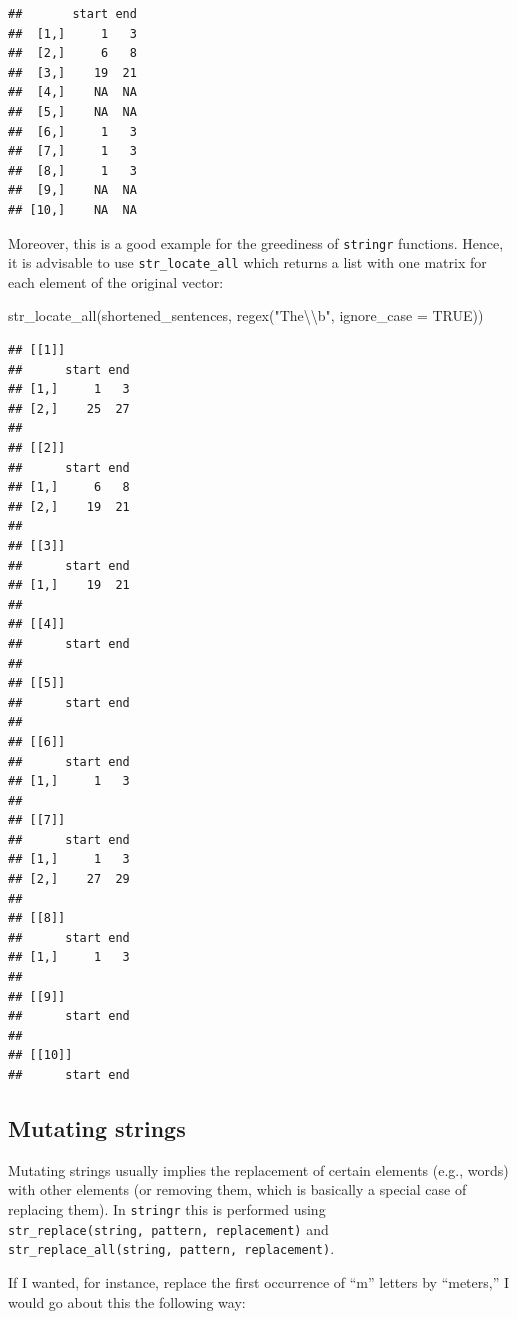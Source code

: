 \documentclass[
]{book}
\newenvironment{Shaded}{\begin{snugshade}}{\end{snugshade}}
\newcommand{\AttributeTok}[1]{\textcolor[rgb]{0.77,0.63,0.00}{#1}}
\newcommand{\ConstantTok}[1]{\textcolor[rgb]{0.00,0.00,0.00}{#1}}
\newcommand{\FunctionTok}[1]{\textcolor[rgb]{0.00,0.00,0.00}{#1}}
\newcommand{\NormalTok}[1]{#1}
\newcommand{\SpecialCharTok}[1]{\textcolor[rgb]{0.00,0.00,0.00}{#1}}
\newcommand{\StringTok}[1]{\textcolor[rgb]{0.31,0.60,0.02}{#1}}
\begin{document}
\begin{verbatim}
##       start end
##  [1,]     1   3
##  [2,]     6   8
##  [3,]    19  21
##  [4,]    NA  NA
##  [5,]    NA  NA
##  [6,]     1   3
##  [7,]     1   3
##  [8,]     1   3
##  [9,]    NA  NA
## [10,]    NA  NA
\end{verbatim}

Moreover, this is a good example for the greediness of \texttt{stringr} functions. Hence, it is advisable to use \texttt{str\_locate\_all} which returns a list with one matrix for each element of the original vector:

\begin{Shaded}
\begin{Highlighting}[]
\FunctionTok{str\_locate\_all}\NormalTok{(shortened\_sentences, }\FunctionTok{regex}\NormalTok{(}\StringTok{"The}\SpecialCharTok{\textbackslash{}\textbackslash{}}\StringTok{b"}\NormalTok{, }\AttributeTok{ignore\_case =} \ConstantTok{TRUE}\NormalTok{))}
\end{Highlighting}
\end{Shaded}

\begin{verbatim}
## [[1]]
##      start end
## [1,]     1   3
## [2,]    25  27
## 
## [[2]]
##      start end
## [1,]     6   8
## [2,]    19  21
## 
## [[3]]
##      start end
## [1,]    19  21
## 
## [[4]]
##      start end
## 
## [[5]]
##      start end
## 
## [[6]]
##      start end
## [1,]     1   3
## 
## [[7]]
##      start end
## [1,]     1   3
## [2,]    27  29
## 
## [[8]]
##      start end
## [1,]     1   3
## 
## [[9]]
##      start end
## 
## [[10]]
##      start end
\end{verbatim}

\hypertarget{mutating-strings}{%
\subsection{Mutating strings}\label{mutating-strings}}

Mutating strings usually implies the replacement of certain elements (e.g., words) with other elements (or removing them, which is basically a special case of replacing them). In \texttt{stringr} this is performed using \texttt{str\_replace(string,\ pattern,\ replacement)} and \texttt{str\_replace\_all(string,\ pattern,\ replacement)}.

If I wanted, for instance, replace the first occurrence of ``m'' letters by ``meters,'' I would go about this the following way:
\end{document}
